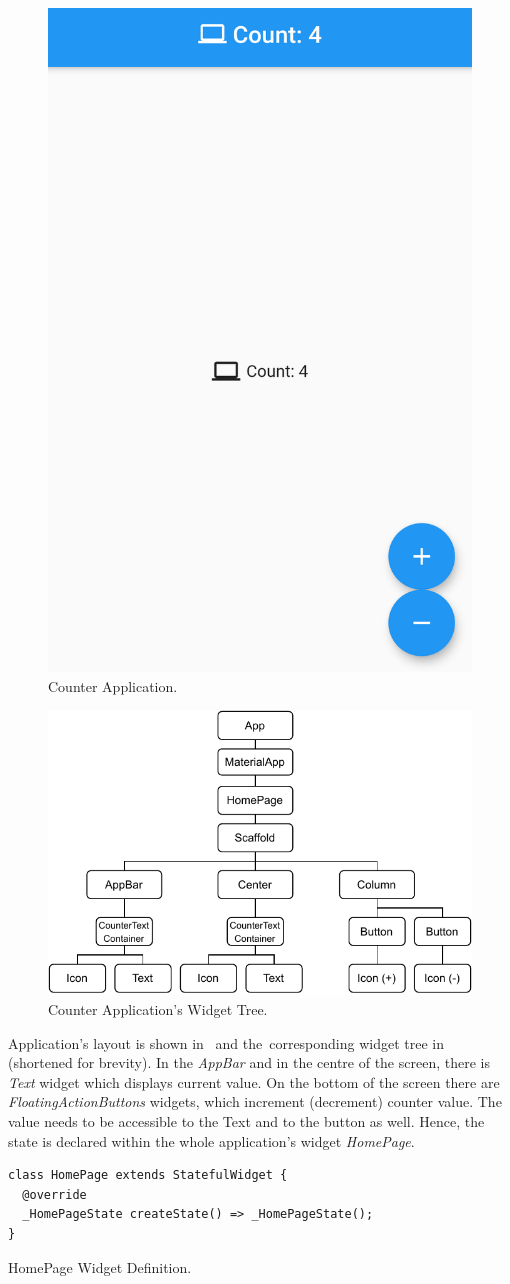 \begin{figure}[htp]
    \centering
    \includegraphics[width=0.33\linewidth]{img/flutter/counter_app_base.png}
    \caption{Counter Application.}
    \label{fig:counter-app}
\end{figure}

\begin{figure}[htp]
    \centering
    \includegraphics[width=0.75\linewidth]{img/flutter/counter-base.pdf}
    \caption{Counter Application's Widget Tree.}
    \label{fig:counter-app-widget-tree}
\end{figure}

Application's layout is shown in~ and the~corresponding widget tree in~ (shortened for brevity). In the \textit{AppBar} and in the centre of the screen, there is \textit{Text} widget which displays current value. On the bottom of the screen there are \textit{FloatingActionButtons} widgets, which increment (decrement) counter value. The value needs to be accessible to the Text and to the button as well. Hence, the state is declared within the whole application's widget \textit{HomePage}.  

\begin{listing}[ht]
\begin{verbatim}
class HomePage extends StatefulWidget {
  @override
  _HomePageState createState() => _HomePageState();
}
\end{verbatim}
\caption{HomePage Widget Definition.}
\label{listing:counter-homepage-widget}
\end{listing}

